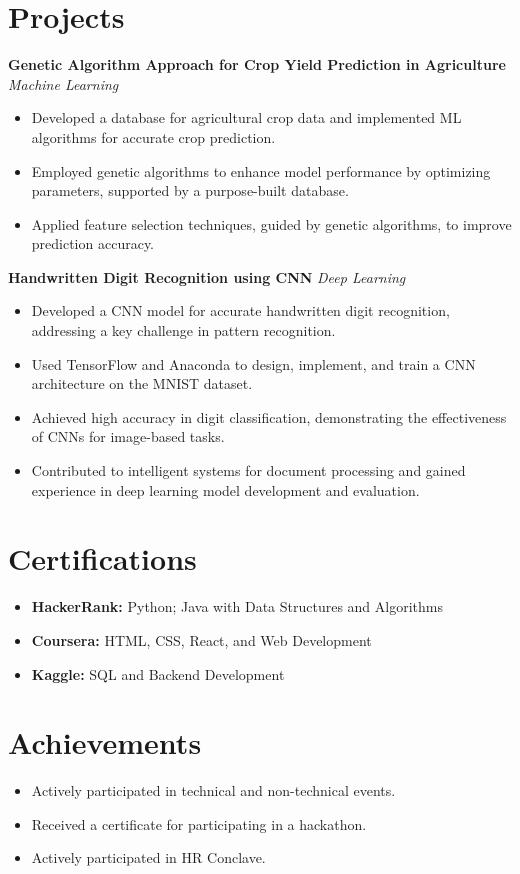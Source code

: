 \documentclass[11pt,a4paper]{article}
\begin{document}
\section{Projects}
\textbf{Genetic Algorithm Approach for Crop Yield Prediction in Agriculture}
\hfill \textit{Machine Learning}
\begin{itemize}
  \item Developed a database for agricultural crop data and implemented ML
        algorithms for accurate crop prediction.
  \item Employed genetic algorithms to enhance model performance by optimizing
        parameters, supported by a purpose-built database.
  \item Applied feature selection techniques, guided by genetic algorithms, to
        improve prediction accuracy.
\end{itemize}

\vspace{4pt}
\textbf{Handwritten Digit Recognition using CNN}
\hfill \textit{Deep Learning}
\begin{itemize}
  \item Developed a CNN model for accurate handwritten digit recognition,
        addressing a key challenge in pattern recognition.
  \item Used TensorFlow and Anaconda to design, implement, and train a CNN
        architecture on the MNIST dataset.
  \item Achieved high accuracy in digit classification, demonstrating the
        effectiveness of CNNs for image-based tasks.
  \item Contributed to intelligent systems for document processing and gained
        experience in deep learning model development and evaluation.
\end{itemize}

\section{Certifications}
\begin{itemize}
  \item \textbf{HackerRank:} Python; Java with Data Structures and Algorithms
  \item \textbf{Coursera:} HTML, CSS, React, and Web Development
  \item \textbf{Kaggle:} SQL and Backend Development
\end{itemize}

\section{Achievements}
\begin{itemize}
  \item Actively participated in technical and non-technical events.
  \item Received a certificate for participating in a hackathon.
  \item Actively participated in HR Conclave.
\end{itemize}
\end{document}
